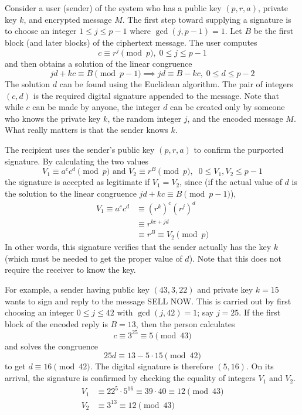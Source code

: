 \documentclass{article}
\newcounter{example}[section]
\newcounter{code}[section]
\begin{document}
Consider a user (sender) of the system who has a public key $(p, r, a)$, private key $k$, and encrypted message $M$. The first step toward supplying a signature is to choose an integer $1 \leq j\leq p-1$ where $\gcd(j, p-1) = 1$. Let $B$ be the first block (and later blocks) of the ciphertext message. The user computes 
\begin{equation}
  c \equiv r^j \pmod{p}, \; 0 \leq j \leq p-1
\end{equation}
and then obtains a solution of the linear congruence
\begin{equation}
  jd + kc \equiv B \pmod{p-1} \implies jd \equiv B-kc, \; 0 \leq d \leq p-2
\end{equation}
The solution $d$ can be found using the Euclidean algorithm. The pair of integers $(c, d)$ is the required digital signature appended to the message. Note that while $c$ can be made by anyone, the integer $d$ can be created only by someone who knows the private key $k$, the random integer $j$, and the encoded message $M$. What really matters is that the sender knows $k$. 

The recipient uses the sender's public key $(p, r, a)$ to confirm the purported signature. By calculating the two values 
\begin{equation}
  V_1 \equiv a^c c^d \pmod{p} \text{ and } V_2 \equiv r^B \pmod{p}, \;\; 0 \leq V_1, V_2 \leq p-1
\end{equation}
the signature is accepted as legitimate if $V_1 = V_2$, since (if the actual value of $d$ is the solution to the linear congruence $jd + kc \equiv B \pmod{p-1}$), 
\begin{align*}
    V_1 \equiv a^c c^d & \equiv (r^k)^c (r^j)^d \\
    & \equiv r^{kc + jd} \\
    & \equiv r^B \equiv V_2 \pmod{p}
\end{align*}
In other words, this signature verifies that the sender actually has the key $k$ (which must be needed to get the proper value of $d$). Note that this does not require the receiver to know the key. 

For example, a sender having public key $(43, 3, 22)$ and private key $k=15$ wants to sign and reply to the message SELL NOW. This is carried out by first choosing an integer $0 \leq j \leq 42$ with $\gcd(j, 42) = 1$; say $j=25$. If the first block of the encoded reply is $B=13$, then the person calculates
\begin{equation}
  c \equiv 3^{25} \equiv 5 \pmod{43}
\end{equation}
and solves the congruence 
\begin{equation}
  25 d \equiv 13 - 5 \cdot 15 \pmod{42}
\end{equation}
to get $d \equiv 16 \pmod{42}$. The digital signature is therefore $(5, 16)$. On its arrival, the signature is confirmed by checking the equality of integers $V_1$ and $V_2$. 
\begin{align*}
    V_1 & \equiv 22^5 \cdot 5^{16} \equiv 39 \cdot 40 \equiv 12 \pmod{43} \\
    V_2 & \equiv 3^{13} \equiv 12 \pmod{43}
\end{align*}
\end{document}
